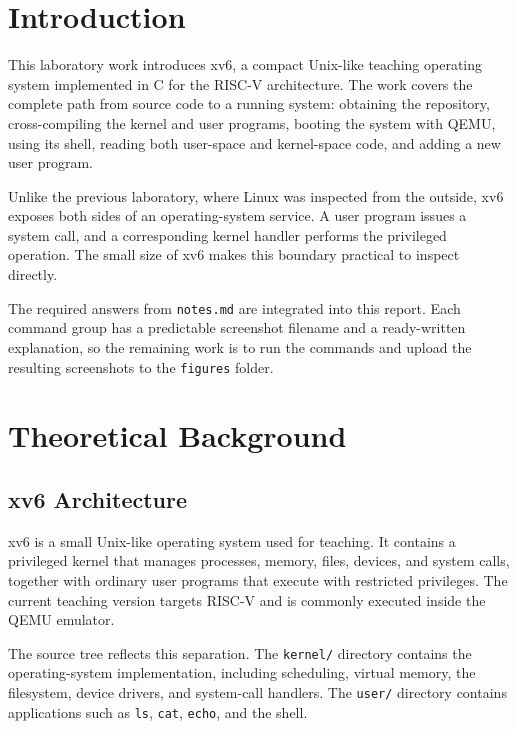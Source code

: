 \documentclass[12pt,a4paper]{article}
\begin{document}
\section*{Introduction}

This laboratory work introduces xv6, a compact Unix-like teaching operating system implemented in C for the RISC-V architecture. The work covers the complete path from source code to a running system: obtaining the repository, cross-compiling the kernel and user programs, booting the system with QEMU, using its shell, reading both user-space and kernel-space code, and adding a new user program.

Unlike the previous laboratory, where Linux was inspected from the outside, xv6 exposes both sides of an operating-system service. A user program issues a system call, and a corresponding kernel handler performs the privileged operation. The small size of xv6 makes this boundary practical to inspect directly.

The required answers from \texttt{notes.md} are integrated into this report. Each command group has a predictable screenshot filename and a ready-written explanation, so the remaining work is to run the commands and upload the resulting screenshots to the \texttt{figures} folder.

\newpage
\section{Theoretical Background}

\subsection{xv6 Architecture}

xv6 is a small Unix-like operating system used for teaching. It contains a privileged kernel that manages processes, memory, files, devices, and system calls, together with ordinary user programs that execute with restricted privileges. The current teaching version targets RISC-V and is commonly executed inside the QEMU emulator.

The source tree reflects this separation. The \texttt{kernel/} directory contains the operating-system implementation, including scheduling, virtual memory, the filesystem, device drivers, and system-call handlers. The \texttt{user/} directory contains applications such as \texttt{ls}, \texttt{cat}, \texttt{echo}, and the shell.
\end{document}
